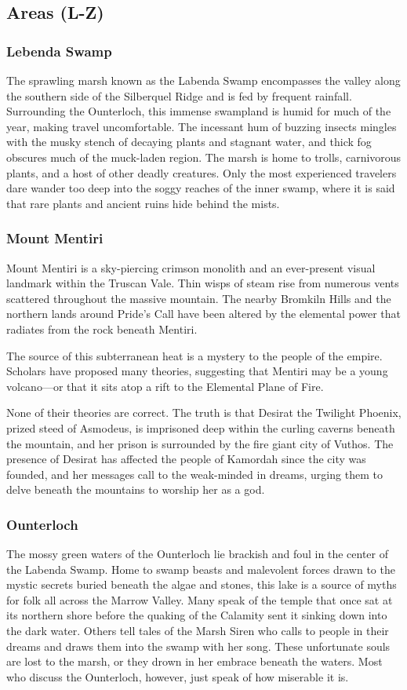\documentclass[10pt,a4paper,twoside,bg=print,twocolumn,openany,nodeprecatedcode]{dndbook}
\begin{document}
\subsection{Areas (L-Z)}
\subsubsection{Lebenda Swamp}
The sprawling marsh known as the Labenda Swamp encompasses the valley along the southern side of the Silberquel Ridge and is fed by frequent rainfall. Surrounding the Ounterloch, this immense swampland is humid for much of the year, making travel uncomfortable. The incessant hum of buzzing insects mingles with the musky stench of decaying plants and stagnant water, and thick fog obscures much of the muck-laden region. The marsh is home to trolls, carnivorous plants, and a host of other deadly creatures. Only the most experienced travelers dare wander too deep into the soggy reaches of the inner swamp, where it is said that rare plants and ancient ruins hide behind the mists.

\subsubsection{Mount Mentiri}
Mount Mentiri is a sky-piercing crimson monolith and an ever-present visual landmark within the Truscan Vale. Thin wisps of steam rise from numerous vents scattered throughout the massive mountain. The nearby Bromkiln Hills and the northern lands around Pride's Call have been altered by the elemental power that radiates from the rock beneath Mentiri.

The source of this subterranean heat is a mystery to the people of the empire. Scholars have proposed many theories, suggesting that Mentiri may be a young volcano—or that it sits atop a rift to the Elemental Plane of Fire.

None of their theories are correct. The truth is that Desirat the Twilight Phoenix, prized steed of Asmodeus, is imprisoned deep within the curling caverns beneath the mountain, and her prison is surrounded by the fire giant city of Vuthos. The presence of Desirat has affected the people of Kamordah since the city was founded, and her messages call to the weak-minded in dreams, urging them to delve beneath the mountains to worship her as a god.

\subsubsection{Ounterloch}
The mossy green waters of the Ounterloch lie brackish and foul in the center of the Labenda Swamp. Home to swamp beasts and malevolent forces drawn to the mystic secrets buried beneath the algae and stones, this lake is a source of myths for folk all across the Marrow Valley. Many speak of the temple that once sat at its northern shore before the quaking of the Calamity sent it sinking down into the dark water. Others tell tales of the Marsh Siren who calls to people in their dreams and draws them into the swamp with her song. These unfortunate souls are lost to the marsh, or they drown in her embrace beneath the waters. Most who discuss the Ounterloch, however, just speak of how miserable it is.
\end{document}
